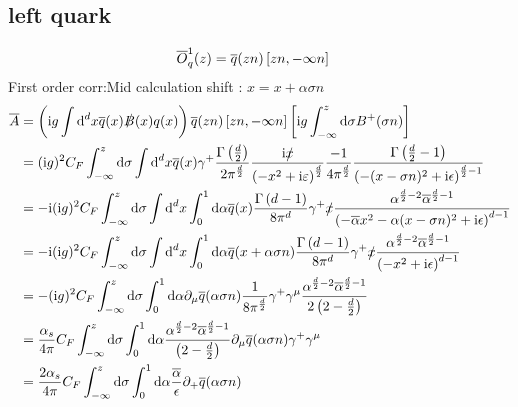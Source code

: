 \subsection{left quark }
\begin{align}
\overline {O}_{q}^{1}(z) 
&=
\overline q(zn)\left[zn,-\infty n  \right]
\end{align}
First order corr:Mid calculation shift : $x = x + \alpha \sigma n$
\begin{align}
	\overline A
	&=
	\left(\text{i} g \int \text{d} ^d x \overline q(x) \slashed {B} (x) q(x)\right)\overline q(zn)\left[zn,-\infty n  \right]\left[\text{i} g \int_{-\infty}^ {z} \text{d} \sigma B^+(\sigma n)\right]
	\\
	&=
	(\text{i} g)^2C_F \int_{-\infty}^ {z} \text{d} \sigma\int \text{d} ^d x \overline q(x) \gamma^+	\frac{\Gamma\left(\frac{d}{2}\right)}{2\pi^{\frac{d}{2}}}\frac{\text{i} \slashed x}{\left(-x^2+\text{i} \varepsilon\right)^{\frac{d}{2}}}\frac{-1}{4 \pi^{\frac{d}{2}}} \frac{\Gamma\left(\frac{d}{2}-1\right)}{\left(-(x-\sigma n)^2+\text{i}\epsilon\right)^{\frac{d}{2}-1}}
	\\
	&=
	-\text{i}(\text{i} g)^2C_F \int_{-\infty}^ {z} \text{d} \sigma\int \text{d} ^d x \int_0^1 \text{d} \alpha \overline q(x) 	\frac{\Gamma\left(d-1\right)}{8\pi^{d}}\gamma^+\slashed x \frac{\alpha^{\frac{d}{2}-2}\overline\alpha^{\frac{d}{2}-1}}{\left(-\overline\alpha x^2-\alpha(x-\sigma n)^2+\text{i}\epsilon\right)^{d-1}}
	\\
	&=
	-\text{i}(\text{i} g)^2C_F \int_{-\infty}^ {z} \text{d} \sigma\int \text{d} ^d x \int_0^1 \text{d} \alpha \overline q(x+\alpha\sigma n) 	\frac{\Gamma\left(d-1\right)}{8\pi^{d}}\gamma^+\slashed x \frac{\alpha^{\frac{d}{2}-2}\overline\alpha^{\frac{d}{2}-1}}{\left(-x^2+\text{i}\epsilon\right)^{d-1}}
	\\
	&=
	-(\text{i} g)^2C_F \int_{-\infty}^ {z} \text{d} \sigma\int_0^1 \text{d} \alpha \partial_\mu\overline q(\alpha\sigma n) 	\frac{1}{8\pi^{\frac{d}{2}}}\gamma^+\gamma^\mu \frac{\alpha^{\frac{d}{2}-2}\overline\alpha^{\frac{d}{2}-1}}{2\left(2-\frac{d}{2}\right)}
	\\
	&=
	\frac{\alpha_s}{4\pi} C_F \int_{-\infty}^ {z} \text{d} \sigma\int_0^1 \text{d} \alpha \frac{\alpha^{\frac{d}{2}-2}\overline\alpha^{\frac{d}{2}-1}}{\left(2-\frac{d}{2}\right)} \partial_\mu\overline q(\alpha\sigma n) 	\gamma^+\gamma^\mu
	\\
	&=
	\frac{2\alpha_s}{4\pi} C_F \int_{-\infty}^ {z} \text{d} \sigma\int_0^1 \text{d} \alpha \frac{\overline\alpha}{\epsilon} \partial_+\overline q(\alpha\sigma n)
\end{align}

